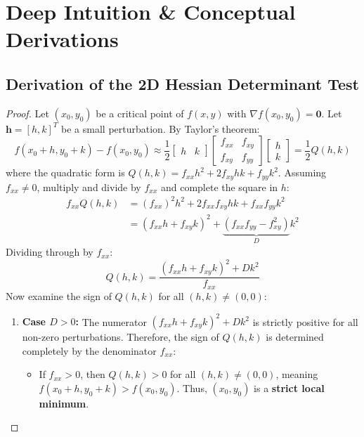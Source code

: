 \section{Deep Intuition \& Conceptual Derivations}

\subsection{Derivation of the 2D Hessian Determinant Test}

\begin{proof}
Let $(x_0, y_0)$ be a critical point of $f(x, y)$ with $\nabla f(x_0, y_0) = \mathbf{0}$.
Let $\mathbf{h} = [h, k]^T$ be a small perturbation. By Taylor's theorem:
\begin{equation*}
f(x_0 + h, y_0 + k) - f(x_0, y_0) \approx \frac{1}{2} \begin{bmatrix} h & k \end{bmatrix} \begin{bmatrix} f_{xx} & f_{xy} \\ f_{xy} & f_{yy} \end{bmatrix} \begin{bmatrix} h \\ k \end{bmatrix} = \frac{1}{2} Q(h, k)
\end{equation*}
where the quadratic form is $Q(h, k) = f_{xx} h^2 + 2 f_{xy} h k + f_{yy} k^2$.
Assuming $f_{xx} \neq 0$, multiply and divide by $f_{xx}$ and complete the square in $h$:
\begin{align*}
f_{xx} Q(h, k) &= (f_{xx})^2 h^2 + 2 f_{xx} f_{xy} h k + f_{xx} f_{yy} k^2 \\
&= (f_{xx} h + f_{xy} k)^2 + \underbrace{(f_{xx} f_{yy} - f_{xy}^2)}_{D} k^2
\end{align*}
Dividing through by $f_{xx}$:
\begin{equation}
Q(h, k) = \frac{(f_{xx} h + f_{xy} k)^2 + D k^2}{f_{xx}}
\end{equation}
Now examine the sign of $Q(h, k)$ for all $(h, k) \neq (0, 0)$:
\begin{enumerate}
    \item \textbf{Case $D > 0$:} The numerator $(f_{xx} h + f_{xy} k)^2 + D k^2$ is strictly positive for all non-zero perturbations.
    Therefore, the sign of $Q(h, k)$ is determined completely by the denominator $f_{xx}$:
    \begin{itemize}
        \item If $f_{xx} > 0$, then $Q(h, k) > 0$ for all $(h, k) \neq (0, 0)$, meaning $f(x_0+h, y_0+k) > f(x_0, y_0)$. Thus, $(x_0, y_0)$ is a \textbf{strict local minimum}.

\end{itemize}
\end{enumerate}
\end{proof}
